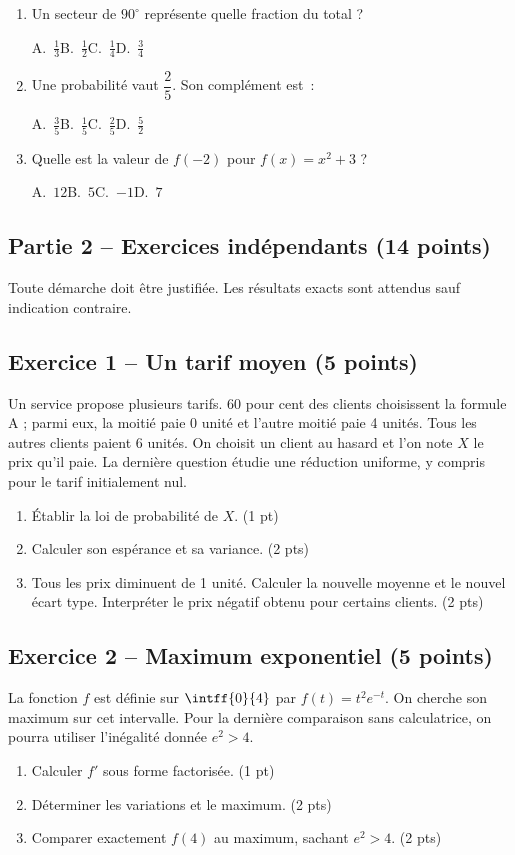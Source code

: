 \begin{enumerate}
\item Un secteur de $90^\circ$ représente quelle fraction du total ?\par A.~$\frac{1}{3}$\quad B.~$\frac{1}{2}$\quad C.~$\frac{1}{4}$\quad D.~$\frac{3}{4}$
\item Une probabilité vaut $\dfrac{2}{5}$. Son complément est~:\par A.~$\frac{3}{5}$\quad B.~$\frac{1}{5}$\quad C.~$\frac{2}{5}$\quad D.~$\frac{5}{2}$
\item Quelle est la valeur de $f(-2)$ pour $f(x)=x^2+3$ ?\par A.~$12$\quad B.~$5$\quad C.~$-1$\quad D.~$7$
\end{enumerate}
\mxnewpage\subsection*{Partie 2 -- Exercices indépendants (14 points)}
Toute démarche doit être justifiée. Les résultats exacts sont attendus sauf indication contraire.
\subsection*{Exercice 1 -- Un tarif moyen (5 points)}
Un service propose plusieurs tarifs. 60 pour cent des clients choisissent la formule A ; parmi eux, la moitié paie 0 unité et l’autre moitié paie 4 unités. Tous les autres clients paient 6 unités. On choisit un client au hasard et l’on note $X$ le prix qu’il paie. La dernière question étudie une réduction uniforme, y compris pour le tarif initialement nul.
\begin{enumerate}
\item Établir la loi de probabilité de $X$. \hfill(1 pt)
\item Calculer son espérance et sa variance. \hfill(2 pts)
\item Tous les prix diminuent de 1 unité. Calculer la nouvelle moyenne et le nouvel écart type. Interpréter le prix négatif obtenu pour certains clients. \hfill(2 pts)
\end{enumerate}
\subsection*{Exercice 2 -- Maximum exponentiel (5 points)}
La fonction $f$ est définie sur $\intff{0}{4}$ par $f(t)=t^2e^{-t}$. On cherche son maximum sur cet intervalle. Pour la dernière comparaison sans calculatrice, on pourra utiliser l’inégalité donnée $e^2>4$.
\begin{enumerate}
\item Calculer $f\prime$ sous forme factorisée. \hfill(1 pt)
\item Déterminer les variations et le maximum. \hfill(2 pts)
\item Comparer exactement $f(4)$ au maximum, sachant $e^2>4$. \hfill(2 pts)
\end{enumerate}
